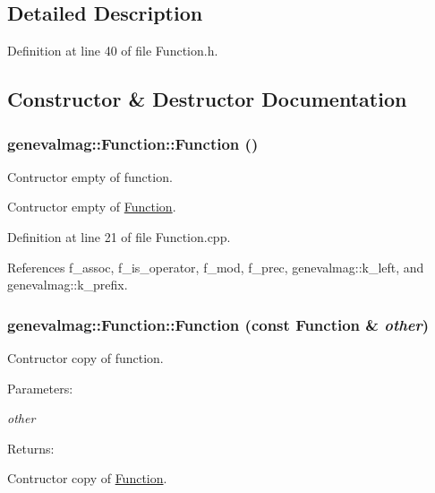 \subsection{Detailed Description}


Definition at line 40 of file Function.h.

\subsection{Constructor \& Destructor Documentation}
\hypertarget{classgenevalmag_1_1Function_88af7b2a3947048e53e0bc9c1d071ad9}{
\subsubsection[{Function}]{\setlength{\rightskip}{0pt plus 5cm}genevalmag::Function::Function ()}}
\label{classgenevalmag_1_1Function_88af7b2a3947048e53e0bc9c1d071ad9}


Contructor empty of function.

Contructor empty of \hyperlink{classgenevalmag_1_1Function}{Function}. 

Definition at line 21 of file Function.cpp.

References f\_\-assoc, f\_\-is\_\-operator, f\_\-mod, f\_\-prec, genevalmag::k\_\-left, and genevalmag::k\_\-prefix.\hypertarget{classgenevalmag_1_1Function_e598ad6ba742b5d73567c41c3cd4d7bd}{
\subsubsection[{Function}]{\setlength{\rightskip}{0pt plus 5cm}genevalmag::Function::Function (const {\bf Function} \& {\em other})}}
\label{classgenevalmag_1_1Function_e598ad6ba742b5d73567c41c3cd4d7bd}


Contructor copy of function. \begin{Desc}
\item[Parameters:]
\begin{description}
\item[{\em other}]\end{description}
\end{Desc}
\begin{Desc}
\item[Returns:]\end{Desc}
Contructor copy of \hyperlink{classgenevalmag_1_1Function}{Function}. 


